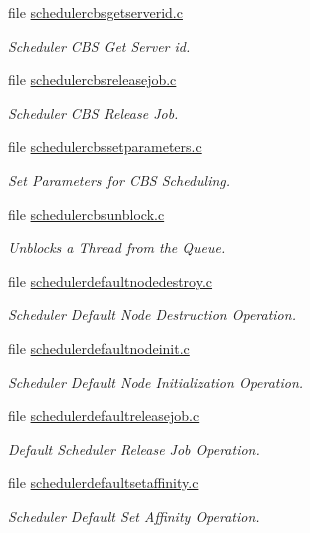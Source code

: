 \begin{DoxyCompactItemize}
file \mbox{\hyperlink{schedulercbsgetserverid_8c}{schedulercbsgetserverid.\+c}}
\begin{DoxyCompactList}\small\item\em Scheduler C\+BS Get Server id. \end{DoxyCompactList}\item 
file \mbox{\hyperlink{schedulercbsreleasejob_8c}{schedulercbsreleasejob.\+c}}
\begin{DoxyCompactList}\small\item\em Scheduler C\+BS Release Job. \end{DoxyCompactList}\item 
file \mbox{\hyperlink{schedulercbssetparameters_8c}{schedulercbssetparameters.\+c}}
\begin{DoxyCompactList}\small\item\em Set Parameters for C\+BS Scheduling. \end{DoxyCompactList}\item 
file \mbox{\hyperlink{schedulercbsunblock_8c}{schedulercbsunblock.\+c}}
\begin{DoxyCompactList}\small\item\em Unblocks a Thread from the Queue. \end{DoxyCompactList}\item 
file \mbox{\hyperlink{schedulerdefaultnodedestroy_8c}{schedulerdefaultnodedestroy.\+c}}
\begin{DoxyCompactList}\small\item\em Scheduler Default Node Destruction Operation. \end{DoxyCompactList}\item 
file \mbox{\hyperlink{schedulerdefaultnodeinit_8c}{schedulerdefaultnodeinit.\+c}}
\begin{DoxyCompactList}\small\item\em Scheduler Default Node Initialization Operation. \end{DoxyCompactList}\item 
file \mbox{\hyperlink{schedulerdefaultreleasejob_8c}{schedulerdefaultreleasejob.\+c}}
\begin{DoxyCompactList}\small\item\em Default Scheduler Release Job Operation. \end{DoxyCompactList}\item 
file \mbox{\hyperlink{schedulerdefaultsetaffinity_8c}{schedulerdefaultsetaffinity.\+c}}
\begin{DoxyCompactList}\small\item\em Scheduler Default Set Affinity Operation. \end{DoxyCompactList}\item 

\end{DoxyCompactItemize}
